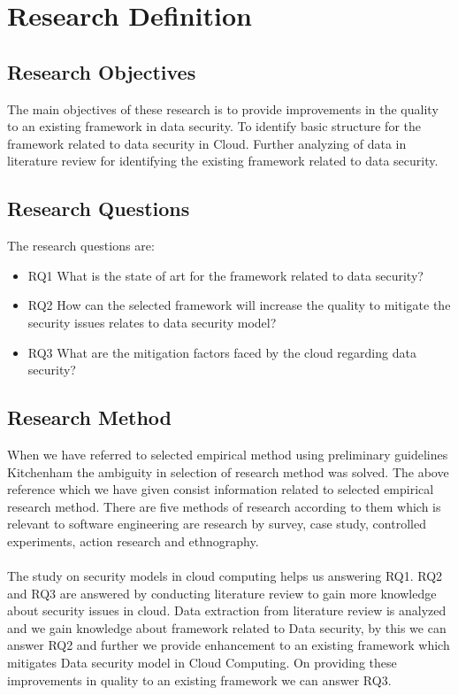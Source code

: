 \section{Research Definition}

\subsection{Research Objectives}
The main objectives of these research is to provide improvements in the quality to an existing framework in data security. To identify basic structure for the framework related to data security in Cloud. Further analyzing of data in literature review for identifying the existing framework related to data security. 

\subsection{Research Questions}
 The research questions are:
\begin{itemize}
\item{RQ1} What is the state of art for the framework related to data security?

\item{RQ2} How can the selected framework will increase the quality to mitigate the security issues relates to data security model?

\item{RQ3} What are the mitigation factors faced by the cloud regarding data security?
\end{itemize}

\subsection{Research Method}
 When we have referred to selected empirical method using preliminary guidelines Kitchenham the ambiguity in selection of research method was solved. The above reference which we have given consist information related to selected empirical research method. There are five methods of research according to them which is relevant to software engineering are research by survey, case study, controlled experiments, action research and ethnography.   
\paragraph{}
The study on security models in cloud computing helps us answering RQ1.
 RQ2 and RQ3 are answered by conducting literature review to gain more knowledge about security issues in cloud. Data extraction from literature review is analyzed and we gain knowledge about framework related to Data security, by this we can answer RQ2 and further we provide enhancement to an existing framework which mitigates Data security model in Cloud Computing. On providing these improvements in quality to an existing framework we can answer RQ3.
